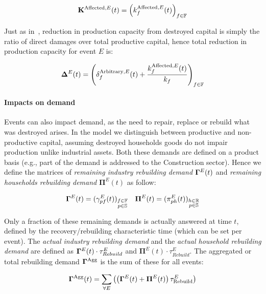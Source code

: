 \[
  \mathbf{K}^{\textrm{Affected},E}(t) = \left (k^{\textrm{Affected},E}_f(t) \right )_{f \in \mathbb{F}}
\]

Just as in~\textcite{hallegatte-2013-model-role}, reduction in
production capacity from destroyed capital is simply the ratio of direct damages
over total productive capital, hence total reduction in production capacity for
event $E$ is:

\[
  \bm{\Delta}^{E}(t) = \left ( \delta^{\textrm{Arbitrary},E}_f(t) +
    \frac{k^{\textrm{Affected},E}_f(t)}{k_f} \right )_{f \in \mathbb{F}}
\]

\paragraph{Impacts on demand}
\label{sec:impacts-demand}

Events can also impact demand, as the need to repair, replace or rebuild what was
destroyed arises. In the model we distinguish between productive and
non-productive capital, assuming destroyed households goods do not impair
production unlike industrial assets. Both these demands are defined on a
product basis (e.g., part of the demand is addressed to the Construction
sector).
Hence we define the matrices of \emph{remaining industry
  rebuilding demand} $\mathbf{\Gamma}^E(t)$ and \emph{remaining households rebuilding demand}
$\bm{\Pi}^E(t)$ as follow:

\begin{align*}
  \mathbf{\Gamma}^{E}(t) = (\gamma^{E}_{pf}(t))_{\substack{f \in \mathbb{F}\\p \in \mathbb{S}}} &&  \bm{\Pi}^{E}(t) = (\pi^{E}_{ph}(t))_{\substack{h \in \mathbb{R}\\p \in \mathbb{S}}}
\end{align*}

Only a fraction of these remaining demands is actually
answered at time $t$, defined by the recovery/rebuilding
characteristic time (which can be set per event). The \emph{actual industry
  rebuilding demand} and the \emph{actual household rebuilding demand} are
defined as $\mathbf{\Gamma}^{E}(t) \cdot \tau^{E}_{Rebuild} $ and $\bm{\Pi}^{E}(t)
\cdot \tau^{E}_{Rebuild}$. The aggregated or total rebuilding demand
$\mathbf{\Gamma}^{\textrm{Agg}}$ is the sum of these for all events:

\label{agg_rebuilding_demand}

\[
  \mathbf{\Gamma}^{\textrm{Agg}}(t) = \sum_{\forall E} \left ( \left ( \mathbf{\Gamma}^E(t) +
    \bm{\Pi}^{E}(t) \right ) \tau^E_{\textrm{Rebuild}} \right )
\]


